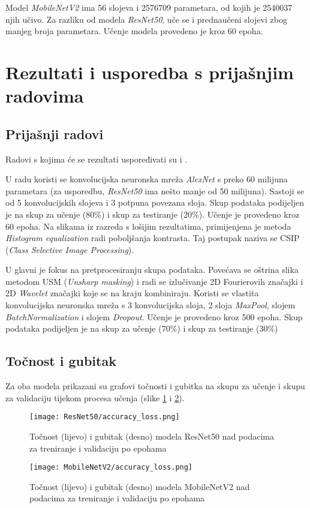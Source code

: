 \documentclass[conference, utf8]{IEEEtran}
\begin{document}
	Model \textit{MobileNetV2} ima 56 slojeva i 2576709 parametara, od kojih je 2540037 njih učivo. Za razliku od modela \textit{ResNet50}, uče se i prednaučeni slojevi zbog manjeg broja parametara. Učenje modela provedeno je kroz 60 epoha.
	
	\section{Rezultati i usporedba s prijašnjim radovima}
	\subsection{Prijašnji radovi}
	Radovi s kojima će se rezultati uspoređivati su \cite{RAD1} i \cite{RAD2}. 
	
	U radu \cite{RAD1} koristi se konvolucijska neuronska mreža \textit{AlexNet} s preko 60 milijuna parametara (za usporedbu, \textit{ResNet50} ima nešto manje od 50 milijuna). Sastoji se od 5 konvolucijskih slojeva i 3 potpuna povezana sloja. Skup podataka podijeljen je na skup za učenje (80\%) i skup za testiranje (20\%). Učenje je provedeno kroz 60 epoha. Na slikama iz razreda s lošijim rezultatima, primijenjena je metoda \textit{Histogram equalization} radi poboljšanja kontrasta. Taj postupak naziva se CSIP (\textit{Class Selective Image Processing}).
	
	U \cite{RAD2} glavni je fokus na pretprocesiranju skupa podataka. Povećava se oštrina slika metodom USM (\textit{Unsharp masking}) i radi se izlučivanje 2D Fourierovih značajki i 2D \textit{Wavelet} značajki koje se na kraju kombiniraju. Koristi se vlastita konvolucijska neuronska mreža s 3 konvolucijska sloja, 2 sloja \textit{MaxPool}, slojem \textit{BatchNormalization} i slojem \textit{Dropout}. Učenje je provedeno kroz 500 epoha. Skup podataka podijeljen je na skup za učenje (70\%) i skup za testiranje (30\%)
	
	\subsection{Točnost i gubitak}
	Za oba modela prikazani su grafovi točnosti i gubitka na skupu za učenje i skupu za validaciju tijekom procesa učenja (slike \ref{fig:RN50_acc_loss} i \ref{fig:MN_acc_loss}). 
	\begin{figure}[H]
		\centering
		\texttt{[image: ResNet50/accuracy\_loss.png]}
		\caption{Točnost (lijevo) i gubitak (desno) modela ResNet50 nad podacima za treniranje i validaciju po epohama}
		\label{fig:RN50_acc_loss}
	\end{figure}
	\begin{figure}[H]
		\centering
		\texttt{[image: MobileNetV2/accuracy\_loss.png]}
		\caption{Točnost (lijevo) i gubitak (desno) modela MobileNetV2 nad podacima za treniranje i validaciju po epohama}
		\label{fig:MN_acc_loss}
	\end{figure}
	
\end{document}
